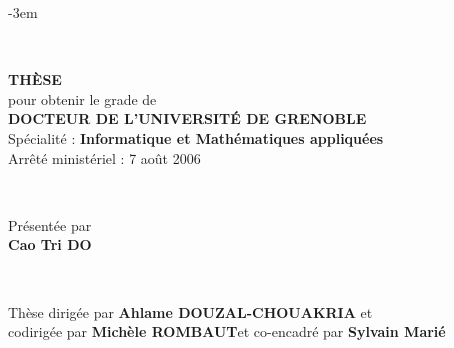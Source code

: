 \begingroup
\fontsize{13pt}{13pt}\selectfont

\AddToShipoutPicture*{\BackgroundPic}
\def\leftshift{0.82\textwidth}
\def\espvert{0.25cm}
\setlength{\parskip}{0pt}
\begin{titlepage}
\begin{adjustwidth}{}{-3em}
\begin{flushleft}

~~

\vfill

\begin{flushright}
\begin{minipage}{\leftshift}
\begin{flushleft}
\textsc{\Large \bf THÈSE}\\[\espvert]
{pour obtenir le grade de}\\[\espvert]
\textsc{\Large \bf DOCTEUR DE L'UNIVERSITÉ DE GRENOBLE}\\[\espvert]
{Spécialité : \textbf{Informatique et Mathématiques appliquées}}\\[\espvert]
{Arrêté ministériel : 7 août 2006}
\end{flushleft}
\end{minipage}
\end{flushright}~~\\[0.75cm]

\vfill

\begin{flushright}
\begin{minipage}{\leftshift}
\begin{flushleft}
{Présentée par}\\
{\Large \textbf{Cao Tri DO}}
\end{flushleft}
\end{minipage}
\end{flushright}~~\\[0.75cm]

\vfill

\begin{flushright}
\begin{minipage}{\leftshift}
\begin{flushleft}
{Thèse dirigée par \textbf{Ahlame DOUZAL-CHOUAKRIA} et\\codirigée par \textbf{Michèle ROMBAUT}et co-encadré par \textbf{Sylvain Marié}}
\end{flushleft}
\end{minipage}
\end{flushright}


\end{flushleft}
\end{adjustwidth}
\end{titlepage}
